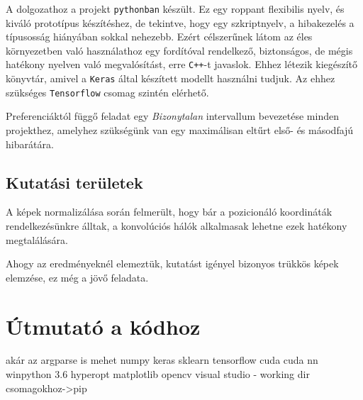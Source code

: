 A dolgozathoz a projekt \texttt{pythonban} készült. Ez egy roppant flexibilis nyelv, és
kiváló prototípus készítéshez, de tekintve, hogy egy szkriptnyelv, a hibakezelés a 
típusosság hiányában sokkal nehezebb. Ezért célszerűnek látom az éles környezetben 
való használathoz egy fordítóval rendelkező, biztonságos, de mégis hatékony nyelven 
való megvalósítást, erre \texttt{C++}-t javaslok. Ehhez létezik kiegészítő könyvtár,
amivel a \texttt{Keras}\cite{keras} által készített modellt használni tudjuk. Az ehhez szükséges
\texttt{Tensorflow}\cite{tensorflow} csomag szintén elérhető.


Preferenciáktól függő feladat egy \textit{Bizonytalan} intervallum bevezetése minden
projekthez, amelyhez szükségünk van egy maximálisan eltűrt első- és másodfajú hibarátára.

\subsection{Kutatási területek}

A képek normalizálása során felmerült, hogy bár a pozicionáló koordináták rendelkezésünkre 
álltak, a konvolúciós hálók alkalmasak lehetne ezek hatékony megtalálására.


Ahogy az eredményeknél elemeztük, kutatást igényel bizonyos trükkös képek elemzése,
ez még a jövő feladata.

%
%
%
%
%
%
%


\newpage
\section{Útmutató a kódhoz}

akár az argparse is mehet
numpy
keras
sklearn
tensorflow
cuda
cuda nn
winpython 3.6
hyperopt
matplotlib
opencv
visual studio - working dir
csomagokhoz->pip


